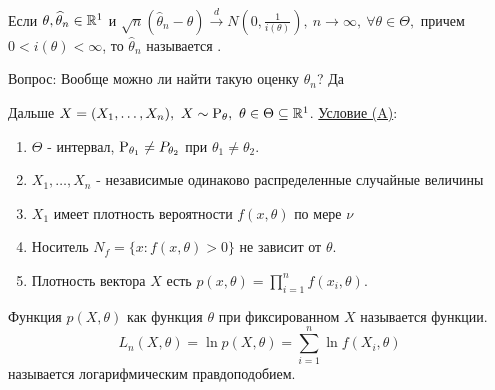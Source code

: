 \begin{definition}
    Если \(\theta, \widehat{\theta}_n \in \R^1\) и $\sqrt{n}(\widehat{\theta}_n - \theta)\xrightarrow{d} N(0, \frac{1}{i(\theta)}),
    \ n \rightarrow \infty, \ \forall \theta \in \Theta,$
    причем \(0 < i(\theta) < \infty\), то \(\widehat{\theta}_n\) называется .
\end{definition}
Вопрос: Вообще можно ли найти такую оценку \(\widehat{\theta}_n\)? Да

\newpage
Дальше \(X = (X_1, \ldots, X_n), \ X \sim \P_\theta,\ \theta \in \Theta \subseteq \R^1\).
\underline{Условие (A)}:
\begin{enumerate}
    \item \(\Theta\) - интервал, \(\P_{\theta_1} \neq P_{\theta_2}\) при \(\theta_1 \neq \theta_2\).
    \item \(X_1, \ldots, X_n\) - независимые одинаково распределенные случайные величины
    \item \(X_1\) имеет плотность вероятности \(f(x, \theta)\) по мере \(\nu\)
    \item Носитель \(N_f = \{x: f(x, \theta) > 0\}\) не зависит от \(\theta\).
    \item Плотность вектора \(X\) есть \(p(x, \theta) = \prod_{i=1}^n f(x_i, \theta)\).
\end{enumerate}
\begin{definition}
    Функция \(p(X, \theta)\) как функция \(\theta\) при фиксированном \(X\) называется
     функции.
    \[L_n(X, \theta) = \ln p(X, \theta) = \sum_{i=1}^n \ln f(X_i, \theta)\]
    называется логарифмическим правдоподобием.
\end{definition}

